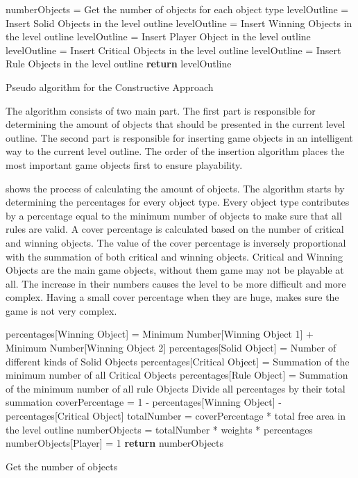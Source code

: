 \begin{algorithm}[H]  
	\BlankLine
	numberObjects = Get the number of objects for each object type\;
	\BlankLine
	levelOutline = Insert Solid Objects in the level outline\;
	levelOutline = Insert Winning Objects in the level outline\;
	levelOutline = Insert Player Object in the level outline\;
	levelOutline = Insert Critical Objects in the level outline\;
	levelOutline = Insert Rule Objects in the level outline\;
	\BlankLine
	\textbf{return} levelOutline\;
	\caption{Pseudo algorithm for the Constructive Approach}
	\label{Algorithm:constructiveApproach}
\end{algorithm}
The algorithm consists of two main part. The first part is responsible for determining the amount of objects that should be presented in the current level outline. The second part is responsible for inserting game objects in an intelligent way to the current level outline. The order of the insertion algorithm places the most important game objects first to ensure playability.\\\par

 shows the process of calculating the amount of objects. The algorithm starts by determining the percentages for every object type. Every object type contributes by a percentage equal to the minimum number of objects to make sure that all rules are valid. A cover percentage is calculated based on the number of critical and winning objects. The value of the cover percentage is inversely proportional with the summation of both critical and winning objects. Critical and Winning Objects are the main game objects, without them game may not be playable at all. The increase in their numbers causes the level to be more difficult and more complex. Having a small cover percentage when they are huge, makes sure the game is not very complex.\\

\begin{algorithm}[H]
	\BlankLine
	percentages[Winning Object] = Minimum Number[Winning Object 1] + Minimum Number[Winning Object 2]\;
	percentages[Solid Object] = Number of different kinds of Solid Objects\;
	percentages[Critical Object] = Summation of the minimum number of all Critical Objects\;
	percentages[Rule Object] = Summation of the minimum number of all rule Objects\;
	Divide all percentages by their total summation\;
	\BlankLine
	coverPercentage = 1 - percentages[Winning Object] - percentages[Critical Object]\;
	totalNumber = coverPercentage * total free area in the level outline\;
	numberObjects = totalNumber * weights * percentages\;
	numberObjects[Player] = 1\;
	\BlankLine
	\textbf{return} numberObjects\;
	\caption{Get the number of objects}
	\label{Algorithm:numberObjects}
\end{algorithm}

